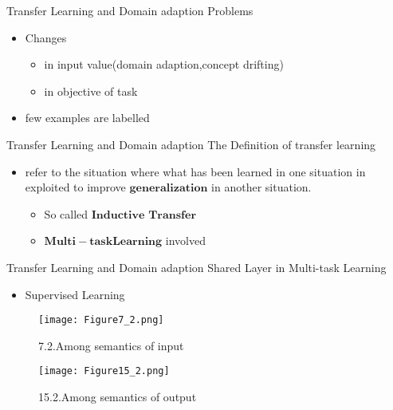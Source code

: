
\begin{frame}{Transfer Learning and Domain adaption}
Problems
\begin{itemize}
  \item Changes
  \begin{itemize} %
    \item in input value(domain adaption,concept drifting)
    \item in objective of task
  \end{itemize}
  \item few examples are labelled
\end{itemize}
\end{frame}

\begin{frame}{Transfer Learning and Domain adaption}
The Definition of transfer learning
\begin{itemize}
  \item refer to the situation where what has been learned in one situation in exploited to improve $\bm{generalization} $ in another situation.
    \begin{itemize} %
    \item So called $\bm{Inductive}$ $\bm{Transfer}$
    \item $\bm{Multi-task}$$\bm{Learning}$ involved
  \end{itemize}

\end{itemize}
\end{frame}

\begin{frame}{Transfer Learning and Domain adaption}
Shared Layer in Multi-task Learning
\begin{itemize}
\item Supervised Learning
\end{itemize}
\begin{figure}[htbp]
\centering
\begin{minipage}[t]{0.3\textwidth}
\centering
\texttt{[image: Figure7\_2.png]}
\caption{7.2.Among semantics of input}
\end{minipage}
\begin{minipage}[t]{0.3\textwidth}
\centering
\texttt{[image: Figure15\_2.png]}
\caption{15.2.Among semantics of output}
\end{minipage}
\end{figure}
\end{frame}

